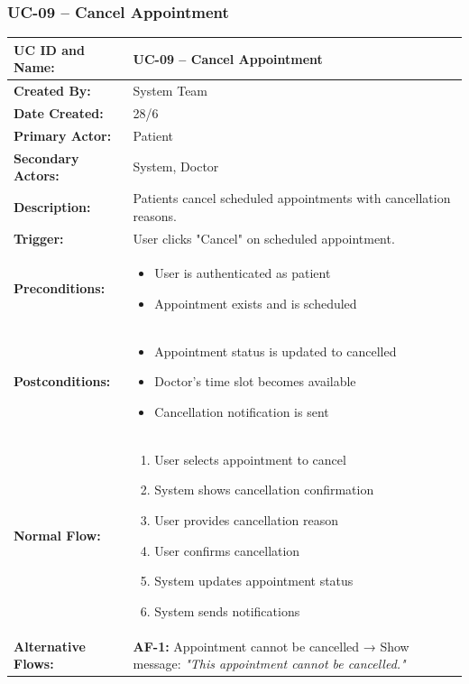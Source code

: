 \documentclass[12pt,a4paper]{article}
\begin{document}
\subsubsection{UC-09 – Cancel Appointment}

\renewcommand{\arraystretch}{1.5}
\begin{longtable}{|p{4.5cm}|p{10.5cm}|}
\hline
\textbf{UC ID and Name:} & UC-09 – Cancel Appointment \\
\hline
\textbf{Created By:} & System Team \\
\hline
\textbf{Date Created:} & 28/6 \\
\hline
\textbf{Primary Actor:} & Patient \\
\hline
\textbf{Secondary Actors:} & System, Doctor \\
\hline
\textbf{Description:} & Patients cancel scheduled appointments with cancellation reasons. \\
\hline
\textbf{Trigger:} & User clicks "Cancel" on scheduled appointment. \\
\hline
\textbf{Preconditions:} &
\begin{itemize}
  \item User is authenticated as patient
  \item Appointment exists and is scheduled
\end{itemize} \\
\hline
\textbf{Postconditions:} &
\begin{itemize}
  \item Appointment status is updated to cancelled
  \item Doctor's time slot becomes available
  \item Cancellation notification is sent
\end{itemize} \\
\hline
\textbf{Normal Flow:} &
\begin{enumerate}
  \item User selects appointment to cancel
  \item System shows cancellation confirmation
  \item User provides cancellation reason
  \item User confirms cancellation
  \item System updates appointment status
  \item System sends notifications
\end{enumerate} \\
\hline
\textbf{Alternative Flows:} &
\textbf{AF-1:} Appointment cannot be cancelled → Show message: \textit{"This appointment cannot be cancelled."} \\

\end{longtable}
\end{document}
